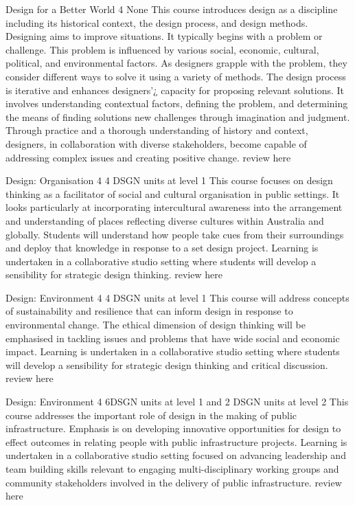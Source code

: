 	{Design for a Better World}
	{4}
	{None}
	{}
	{}
	{This course introduces design as a discipline including its historical context, the design process, and design methods. Designing aims to improve situations. It typically begins with a problem or challenge. This problem is influenced by various social, economic, cultural, political, and environmental factors. As designers grapple with the problem, they consider different ways to solve it using a variety of methods. The design process is iterative and enhances designers’¿ capacity for proposing relevant solutions. It involves understanding contextual factors, defining the problem, and determining the means of finding solutions new challenges through imagination and judgment. Through practice and a thorough understanding of history and context, designers, in collaboration with diverse stakeholders, become capable of addressing complex issues and creating positive change.}
	{review here}

	{Design: Organisation}
	{4}
	{4 DSGN units at level 1}
	{}
	{}
	{This course focuses on design thinking as a facilitator of social and cultural organisation in public settings. It looks particularly at incorporating intercultural awareness into the arrangement and understanding of places reflecting diverse cultures within Australia and globally. Students will understand how people take cues from their surroundings and deploy that knowledge in response to a set design project. Learning is undertaken in a collaborative studio setting where students will develop a sensibility for strategic design thinking.}
	{review here}

	{Design: Environment}
	{4}
	{4 DSGN units at level 1}
	{}
	{}
	{This course will address concepts of sustainability and resilience that can inform design in response to environmental change. The ethical dimension of design thinking will be emphasised in tackling issues and problems that have wide social and economic impact. Learning is undertaken in a collaborative studio setting where students will develop a sensibility for strategic design thinking and critical discussion.}
	{review here}

	{Design: Environment}
	{4}
	{6DSGN units at level 1 and 2 DSGN units at level 2}
	{}
	{}
	{This course addresses the important role of design in the making of public infrastructure. Emphasis is on developing innovative opportunities for design to effect outcomes in relating people with public infrastructure projects. Learning is undertaken in a collaborative studio setting focused on advancing leadership and team building skills relevant to engaging multi-disciplinary working groups and community stakeholders involved in the delivery of public infrastructure.}
	{review here}

